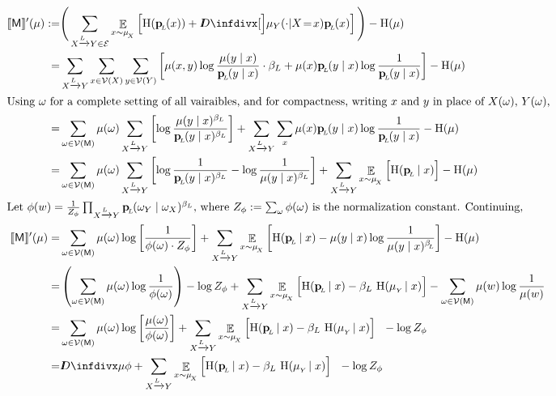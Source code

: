 \documentclass{article}
\newcommand{\bp}[1][L]{\mat{p}_{\!_#1\!}}
\newcommand{\V}{\mathcal V}
\newcommand{\Ed}{\mathcal E}
\newcommand{\sfM}{\mathsf M}
\newcommand{\alle}[1][L]{_{ X \xrightarrow{\!\!#1} Y }}
\newcommand{\ubrace}[3][blue]{\begingroup\color{#1} \vphantom{#2}\smash{\underbrace{\color{black}#2}_{#3}}\endgroup}
\begin{document}
	\begin{align*}
		\bbr{\sfM}'(\mu) :=& \Bigg(\sum_{ X \xrightarrow{\!\!L} Y  \in \Ed } \E_{x \sim \mu_{\!_X}}  \left[ \H (\bp (x)) +\kldiv[\Big]{ \mu_Y(\cdot | X \!=\! x) }{\bp(x) }  \right] \Bigg) - \H(\mu) \\
		=& \sum_{ X \xrightarrow{\!\!L} Y } \sum_{x \in \V(X)} \sum_{y \in \V(Y)}  \left[
			\mu(x,y) \log \frac{\mu(y \mid x)}{\bp(y \mid x)}\cdot \beta_L 
			+ \mu(x) \bp(y \mid x) \log \frac{1}{\bp(y \mid x)} \right]  - \H(\mu) \\
%
\intertext{Using $\omega$ for a complete setting of all vairaibles, and for compactness, writing $x$ and $y$ in place of $X(\omega)$, $Y(\omega)$, }
%
		=& \sum_{\omega \in \V(\sfM)} \mu(\omega) \sum\alle \left[
			\log \frac{\mu(y \mid x)^{\beta_L}}{\bp(y \mid x)^{\beta_L}} 
			\right] + \sum\alle \sum_{x} \mu(x) \bp(y \mid x) \log \frac{1}{\bp(y \mid x)}   - \H(\mu) \\
%
		=& \sum_{\omega \in \V(\sfM)} \mu(\omega) \sum\alle \left[
			\log \frac{1}{\bp(y \mid x)^{\beta_L} } - \log \frac{1}{\mu(y \mid x)^{\beta_L}}
			\right] + \sum\alle \E_{x \sim \mu_{\!_X}} \Big[ \H(\bp \mid x) \Big] - \H(\mu) \\
%
	\intertext{Let $\phi(w) = \frac{1}{Z_{\phi}}\prod\alle \bp(\omega_Y \mid \omega_X)^{\beta_L}$, where $Z_\phi := \sum_{\omega} \phi(\omega)$ is the normalization constant. Continuing,}
%
		\bbr{\sfM}'(\mu) =& \sum_{\omega \in \V(\sfM)} \mu(\omega) \log \left[
			\frac{1}{\phi(\omega) \cdot Z_\phi} 
			\right] + \sum\alle \E_{x \sim \mu_{\!_X}} \left[ \H(\bp \mid x) - \mu(y \mid x) \log \frac{1}{\mu(y \mid x)^{\beta_{\!_L}\!}} \right]  - \H(\mu) \\
%
		=& \left(\sum_{\omega \in \V(\sfM)} \mu(\omega) \log \frac{1}{\phi(\omega) }\right) - \log Z_\phi + 
			\sum\alle \E_{x \sim \mu_{\!_X}} \Big[ \H(\bp \mid x) - \beta_L \ \H(\mu_{_Y}\! \mid x) \Big] -\sum_{\omega \in \V(\sfM)} \mu(w) \log \frac{1}{\mu(w)}  \\
%		
		=& \sum_{\omega \in \V(\sfM)} \mu(\omega) \log \left[
			\frac{\mu(\omega)}{\phi(\omega)  } 
			\right]  + \sum\alle \E_{x \sim \mu_{\!_X}} \Big[ \H(\bp \mid x) - \beta_L \ \H(\mu_{_Y}\! \mid x) \Big] ~~ - \log Z_\phi \\
		=& \kldiv{\mu}{\phi} + \sum\alle \E_{x \sim \mu_{\!_X}} \Big[ \H(\bp \mid x) - \beta_L \ \H(\mu_{_Y}\! \mid x) \Big] ~~ - \log Z_\phi 
	\end{align*}
	
\end{document}
